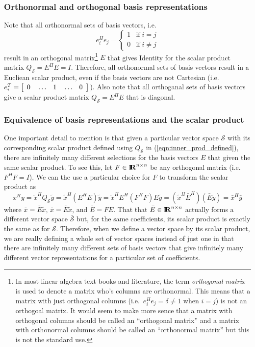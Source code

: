 \subsubsection{Orthonormal and orthogonal basis representations}

Note that all orthonormal sets of basis vectors, i.e.
\[
e_i^H e_j = \left\{ \begin{array}{ll} 1 & \mbox{if} \; i = j \\ 0 & \mbox{if} \; i \ne j \end{array}  \right.
\]
result in an orthogonal matrix\footnote{In most linear algebra text books and
literature, the term {}\textit{orthogonal matrix} is used to denote a matrix
who's columns are orthonormal.  This means that a matrix with just orthogonal
columns (i.e.\ $e_i^H e_j = \delta \ne 1$ when $i=j$) is not an orthogoal
matrix.  It would seem to make more sence that a matrix with orthogonal
columns should be called an ``orthogonal matrix'' and a matrix with
orthonormal columns should be called an ``orthonormal matrix'' but this is not
the standard use.} $E$ that gives Identity for the scalar product matrix
$Q_{\mathcal{S}} = E^H E = I$.  Therefore, all orthonormal sets of basis
vectors result in a Eucliean scalar product, even if the basis vectors are not
Cartesian (i.e.\ $e_i^T = {\bmat{ccccc} 0 & {}\ldots & 1 & {}\ldots & 0
{}\emat}$). Also note that all orthoganal sets of basis vectors give a scalar
product matrix $Q_{\mathcal{S}} = E^H E$ that is diagonal.

\subsubsection{Equivalence of basis representations and the scalar product}

One important detail to mention is that given a particular vector space
$\mathcal{S}$ with its corresponding scalar product defined using
$Q_{\mathcal{S}}$ in (\ref{eqn:inner_prod_defined}), there are infinitely many
different selections for the basis vectors $E$ that given the same scalar
product.  To see this, let $F\in\RE^{n\times{}n}$ be any orthogonal matrix
(i.e.\ $F^H F = I$).  We can the use a particular choice for $F$ to transform
the scalar product as
%
\begin{equation}
x^H y = \tilde{x}^H Q_{\mathcal{S}} \tilde{y}
= \tilde{x}^H ( E^H E ) \tilde{y}
= \tilde{x}^H E^H ( F^H F ) E \tilde{y}
= ( \tilde{x}^H \bar{E}^H ) ( \bar{E} \tilde{y} )
= \bar{x}^H \bar{y}
\label{eqn:inner_x_y_F_E_prod}
\end{equation}
%
where $\bar{x} = {}\bar{E} {}\tilde{x}$, $\bar{x} = {}\bar{E} {}\tilde{x}$,
and $\bar{E} = F E$.  That that $\bar{E}\in\RE^{n\times{}n}$ actually forms a
different vector space $\bar{\mathcal{S}}$ but, for the same coefficients, its
scalar product is exactly the same as for $\mathcal{S}$.  Therefore, when we
define a vector space by its scalar product, we are really defining a whole
set of vector spaces instead of just one in that there are infinitely many
different sets of basis vectors that give infinitely many different vector
representations for a particular set of coefficients.

